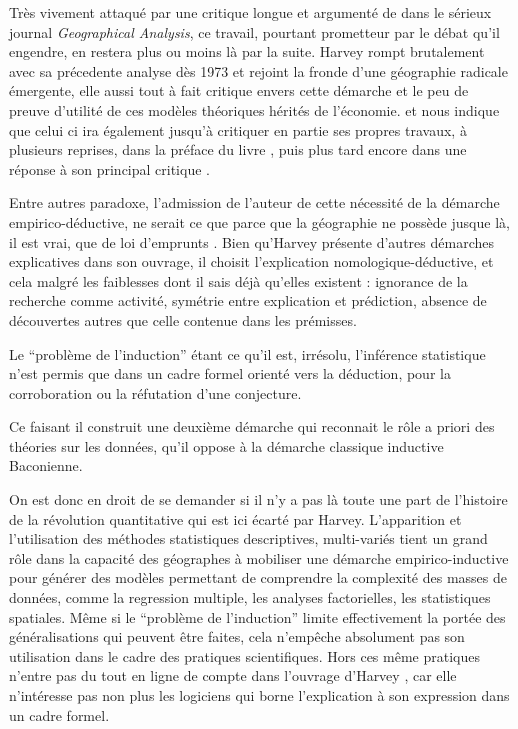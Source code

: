 Très vivement attaqué par une critique longue et argumenté de \textcite{Gale1972} dans le sérieux journal \textit{Geographical Analysis}, ce travail, pourtant prometteur par le débat qu'il engendre, en restera plus ou moins là par la suite. Harvey rompt brutalement avec sa précedente analyse dès 1973 \autocite[166-168]{Gould2004} et rejoint la fronde d'une géographie radicale émergente, elle aussi tout à fait critique envers cette démarche et le peu de preuve d'utilité de ces modèles théoriques hérités de l'économie. \textcite[30]{Johnston2008} et \textcite[37]{Barnes2005} nous indique que celui ci ira également jusqu'à critiquer en partie ses propres travaux, à plusieurs reprises, dans la préface du livre \autocite{Harvey1969}, puis plus tard encore \autocite{Harvey1972} dans une réponse à son principal critique \textcite{Gale1972}.

Entre autres paradoxe, l'admission de l'auteur de cette nécessité de la démarche empirico-déductive, ne serait ce que parce que la géographie ne possède jusque là, il est vrai, que de loi d'emprunts \autocite[41-42]{Harvey1969}. Bien qu'Harvey présente d'autres démarches explicatives dans son ouvrage, il choisit l'explication nomologique-déductive, et cela malgré les faiblesses dont il sais déjà qu'elles existent : ignorance de la recherche comme activité, symétrie entre explication et prédiction, absence de découvertes autres que celle contenue dans les prémisses.

Le \enquote{problème de l'induction} étant ce qu'il est, irrésolu, l'inférence statistique n'est permis que dans un cadre formel orienté vers la déduction, pour la corroboration ou la réfutation d'une conjecture.

Ce faisant il construit une deuxième démarche qui reconnait le rôle a priori des théories sur les données, qu'il oppose à la démarche classique inductive Baconienne.

On est donc en droit de se demander si il n'y a pas là toute une part de l'histoire de la révolution quantitative qui est ici écarté par Harvey. L'apparition et l'utilisation des méthodes statistiques descriptives, multi-variés tient un grand rôle dans la capacité des géographes à mobiliser une démarche empirico-inductive pour générer des modèles permettant de comprendre la complexité des masses de données, comme la regression multiple, les analyses factorielles, les statistiques spatiales. Même si le \enquote{problème de l'induction} limite effectivement la portée des généralisations qui peuvent être faites, cela n’empêche absolument pas son utilisation dans le cadre des pratiques scientifiques. Hors ces même pratiques n'entre pas du tout en ligne de compte dans l'ouvrage d'Harvey \autocite{Harvey1969}, car elle n'intéresse pas non plus les logiciens qui borne l'explication à son expression dans un cadre formel.

